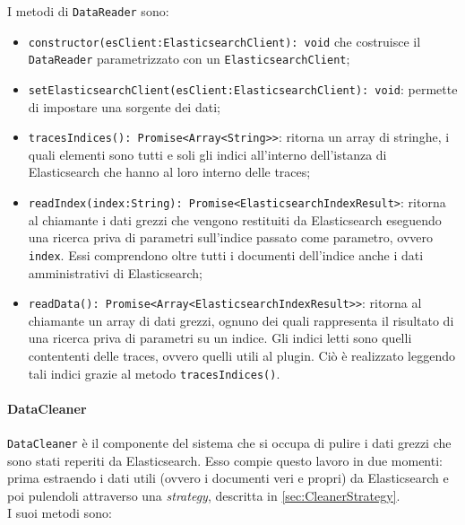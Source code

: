 I metodi di \texttt{DataReader} sono:  

\begin{itemize} 
	\item \texttt{constructor(esClient:ElasticsearchClient): void} che costruisce il \texttt{DataReader} parametrizzato con un \texttt{ElasticsearchClient};
	\item \texttt{setElasticsearchClient(esClient:ElasticsearchClient): void}: permette di impostare una sorgente dei dati;
	\item \texttt{tracesIndices(): Promise<Array<String>>}: ritorna un array di stringhe, i quali elementi sono tutti e soli gli indici all'interno dell'istanza di Elasticsearch che hanno al loro interno delle traces;
	\item \texttt{readIndex(index:String): Promise<ElasticsearchIndexResult>}: ritorna al chiamante i dati grezzi che vengono restituiti da Elasticsearch eseguendo una ricerca priva di parametri sull'indice passato come parametro, ovvero \texttt{index}. Essi comprendono oltre tutti i documenti dell'indice anche i dati amministrativi di Elasticsearch;
	\item \texttt{readData(): Promise<Array<ElasticsearchIndexResult>>}: ritorna al chiamante un array di dati grezzi, ognuno dei quali rappresenta il risultato di una ricerca priva di parametri su un indice. Gli indici letti sono quelli contententi delle traces, ovvero quelli utili al plugin. Ciò è realizzato leggendo tali indici grazie al metodo \texttt{tracesIndices()}.
\end{itemize}



\paragraph{DataCleaner}\Spazio
\label{sec:DataCleaner}
\texttt{DataCleaner} è il componente del sistema che si occupa di pulire i dati grezzi che sono stati reperiti da Elasticsearch. Esso compie questo lavoro in due momenti: prima estraendo i dati utili (ovvero i documenti veri e propri) da Elasticsearch e poi pulendoli attraverso una \emph{strategy}, descritta in \ref{sec:CleanerStrategy}.\\
I suoi metodi sono:

